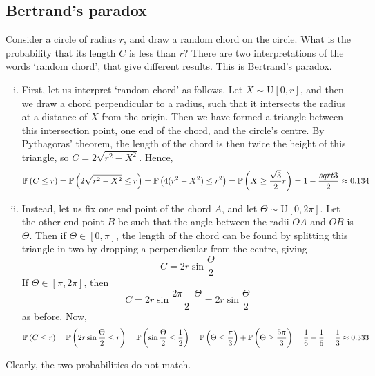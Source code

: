 \subsection{Bertrand's paradox}
Consider a circle of radius \(r\), and draw a random chord on the circle.
What is the probability that its length \(C\) is less than \(r\)?
There are two interpretations of the words `random chord', that give different results.
This is Bertrand's paradox.
\begin{enumerate}[(i)]
	\item First, let us interpret `random chord' as follows.
	      Let \(X \sim \mathrm{U}[0, r]\), and then we draw a chord perpendicular to a radius, such that it intersects the radius at a distance of \(X\) from the origin.
	      Then we have formed a triangle between this intersection point, one end of the chord, and the circle's centre.
	      By Pythagoras' theorem, the length of the chord is then twice the height of this triangle, so \(C = 2\sqrt{r^2 - X^2}\).
	      Hence,
	      \[
		      \mathbb{P}\left({C \leq r}\right) = \mathbb{P}\left({2\sqrt{r^2 - X^2} \leq r}\right) = \mathbb{P}\left({4(r^2 - X^2) \leq r^2}\right) = \mathbb{P}\left({X \geq \frac{\sqrt{3}}{2}r}\right) = 1 - \frac{sqrt 3}{2} \approx 0.134
	      \]
	\item Instead, let us fix one end point of the chord \(A\), and let \(\Theta \sim \mathrm{U}[0, 2\pi]\).
	      Let the other end point \(B\) be such that the angle between the radii \(OA\) and \(OB\) is \(\Theta\).
	      Then if \(\Theta \in [0, \pi]\), the length of the chord can be found by splitting this triangle in two by dropping a perpendicular from the centre, giving
	      \[
		      C = 2r\sin\frac{\Theta}{2}
	      \]
	      If \(\Theta \in [\pi, 2\pi]\), then
	      \[
		      C = 2r\sin\frac{2\pi - \Theta}{2} = 2r\sin\frac{\Theta}{2}
	      \]
	      as before.
	      Now,
	      \[
		      \mathbb{P}\left({C \leq r}\right) = \mathbb{P}\left({2r\sin\frac{\Theta}{2} \leq r}\right) = \mathbb{P}\left({\sin\frac{\Theta}{2} \leq \frac{1}{2}}\right) = \mathbb{P}\left({\Theta \leq \frac{\pi}{3}}\right) + \mathbb{P}\left({\Theta \geq \frac{5\pi}{3}}\right) = \frac{1}{6} + \frac{1}{6} = \frac{1}{3} \approx 0.333
	      \]
\end{enumerate}
Clearly, the two probabilities do not match.

